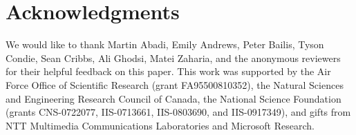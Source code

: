 \section*{Acknowledgments}
We would like to thank Martin Abadi, Emily Andrews, Peter Bailis, Tyson Condie,
Sean Cribbs, Ali Ghodsi, Matei Zaharia, and the anonymous reviewers for their
helpful feedback on this paper.  This work was supported by the Air Force Office
of Scientific Research (grant FA95500810352), the Natural Sciences and
Engineering Research Council of Canada, the National Science Foundation (grants
CNS-0722077, IIS-0713661, IIS-0803690, and IIS-0917349), and gifts from NTT
Multimedia Communications Laboratories and Microsoft Research.
